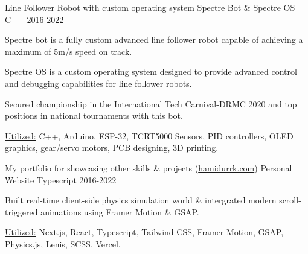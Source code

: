 \begin{cventries}
      \cventryprojects
      {Line Follower Robot with custom operating system} %
      {Spectre Bot \& Spectre OS} %
      {C++} %
      {2016-2022} %
      {
        \begin{cvitems} %
          \item {Spectre bot is a fully custom advanced line 
          follower robot capable of achieving a maximum of 5m/s speed on track.}
          \item {Spectre OS is a custom operating system designed to provide advanced control and 
          debugging capabilities for line follower robots.}
          \item {Secured championship in the International Tech Carnival-DRMC 2020 and top positions in national tournaments with this bot.}
          \item {\underline{Utilized:} C++, Arduino, ESP-32, TCRT5000 Sensors, PID controllers, OLED graphics, gear/servo motors, PCB designing, 3D printing.}
        \end{cvitems}
        }
        
      \cventryprojects
      {My portfolio for showcasing other skills \& projects (\href{https://hamidurrk.com}{hamidurrk.com})} %
      {Personal Website} %
      {Typescript} %
      {2016-2022} %
      {
        \begin{cvitems}
          \item {Built real-time client-side physics simulation world \& intergrated modern scroll-triggered animations using Framer Motion \& GSAP.}
          \item {\underline{Utilized:} Next.js, React, Typescript, Tailwind CSS, Framer Motion, GSAP, Physics.js, Lenis, SCSS, Vercel.}
        \end{cvitems}
        }
\end{cventries}
